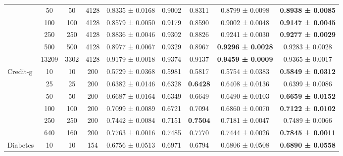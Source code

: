 \begin{table}
{\begin{tabular}[H]{@{}lcccccccc@{}}
                              & 50    & 50   & 4128 & 0.8335 ± 0.0168      & 0.9002               & 0.8311          & 0.8799 ± 0.0098          & \textbf{0.8938 ± 0.0085} \\
                              & 100   & 100  & 4128 & 0.8579 ± 0.0050      & 0.9179               & 0.8590          & 0.9002 ± 0.0048          & \textbf{0.9147 ± 0.0045} \\
                              & 250   & 250  & 4128 & 0.8836 ± 0.0046      & 0.9302               & 0.8826          & 0.9241 ± 0.0030          & \textbf{0.9277 ± 0.0029} \\
                              & 500   & 500  & 4128 & 0.8977 ± 0.0067      & 0.9329               & 0.8967          & \textbf{0.9296 ± 0.0028} & 0.9283 ± 0.0028          \\
                              & 13209 & 3302 & 4128 & 0.9179 ± 0.0018      & 0.9374               & 0.9137          & \textbf{0.9459 ± 0.0009} & 0.9365 ± 0.0017          \\
                              \midrule
\multirow{6}{*}{Credit-g}     & 10    & 10   & 200  & 0.5729 ± 0.0368      & 0.5981               & 0.5817          & 0.5754 ± 0.0383          & \textbf{0.5849 ± 0.0312} \\
                              & 25    & 25   & 200  & 0.6382 ± 0.0146      & 0.6328               & \textbf{0.6428} & 0.6408 ± 0.0136          & 0.6399 ± 0.0086          \\
                              & 50    & 50   & 200  & 0.6687 ± 0.0164      & 0.6349               & 0.6649          & 0.6490 ± 0.0103          & \textbf{0.6659 ± 0.0152} \\
                              & 100   & 100  & 200  & 0.7099 ± 0.0089      & 0.6721               & 0.7094          & 0.6860 ± 0.0070          & \textbf{0.7122 ± 0.0102} \\
                              & 250   & 250  & 200  & 0.7442 ± 0.0084      & 0.7151               & \textbf{0.7504} & 0.7181 ± 0.0047          & 0.7489 ± 0.0066          \\
                              & 640   & 160  & 200  & 0.7763 ± 0.0016      & 0.7485               & 0.7770          & 0.7444 ± 0.0026          & \textbf{0.7845 ± 0.0011} \\
                              \midrule
\multirow{6}{*}{Diabetes}     & 10    & 10   & 154  & 0.6756 ± 0.0513      & 0.6971               & 0.6794          & 0.6806 ± 0.0508          & \textbf{0.6890 ± 0.0558} \\

\end{tabular}}
\end{table}
